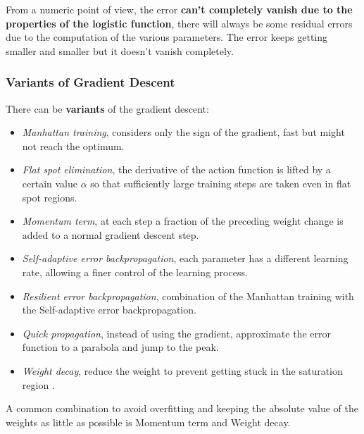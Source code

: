 From a numeric point of view, the error \textbf{can't completely vanish due to the properties of the logistic function}, there will always be some residual errors due to the computation of the various parameters. The error keeps getting smaller and smaller but it doesn't vanish completely.\\

\newpage

\subsubsection{Variants of Gradient Descent}
There can be \textbf{variants} of the gradient descent: 
\begin{itemize}
	\item \textit{Manhattan training}, considers only the sign of the gradient, fast but might not reach the optimum.\\
	\item \textit{Flat spot elimination}, the derivative of the action function is lifted by a certain value $\alpha$ so that sufficiently large training steps are taken even in flat spot regions.\\
	\item \textit{Momentum term}, at each step a fraction of the preceding weight change is added to a normal gradient descent step.\\
	\item \textit{Self-adaptive error backpropagation}, each parameter has a different learning rate, allowing a finer control of the learning process.\\
	\item \textit{Resilient error backpropagation}, combination of the Manhattan training with the Self-adaptive error backpropagation.\\
	\item \textit{Quick propagation}, instead of using the gradient, approximate the error function to a parabola and jump to the peak.\\
	\item \textit{Weight decay}, reduce the weight to prevent getting stuck in the saturation region .\\
\end{itemize}
A common combination to avoid overfitting and keeping the absolute value of the weights as little as possible is Momentum term and Weight decay.\\

\newpage

